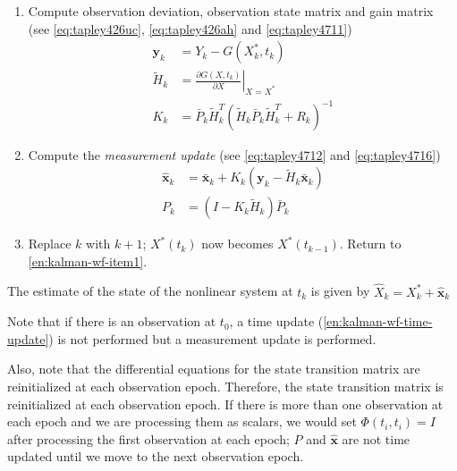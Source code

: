 \begin{enumerate}
	\item Compute observation deviation, observation state matrix and gain matrix (see \ref{eq:tapley426uc}, \ref{eq:tapley426ah} and \ref{eq:tapley4711})
	      \begin{subequations}
		      \begin{align}
			      \bm{y}_k    & = Y_k - G(X^*_k , t_k )                                         \\
			      \tilde{H}_k & = \left.\frac{\partial G(X , t_k )}{\partial X} \right|_{X=X^*} \\
			      K_k         & =
			      \bar{P}_k \tilde{H}^T_k
			      \left( \tilde{H}_k \bar{P}_k \tilde{H}^T_k + R_k \right) ^{-1}
		      \end{align}
	      \end{subequations}

	\item Compute the \emph{measurement update} (see \ref{eq:tapley4712} and \ref{eq:tapley4716})
	      \begin{subequations}
		      \begin{align}
			      \hat{\bm{x}}_k & = \bar{\bm{x}}_k + K_k \left( \bm{y}_k - \tilde{H}_k \bar{\bm{x}}_k \right) \\
			      P_k            & = \left( I - K_k \tilde{H}_k \right) \bar{P}_k
		      \end{align}
	      \end{subequations}

	\item Replace \(k\) with \(k+1\); \(X^*(t_k)\) now becomes \(X^*(t_{k-1})\).
	      Return to \ref{en:kalman-wf-item1}.

\end{enumerate}

The estimate of the state of the nonlinear system at \(t_k\) is given by
\(\hat{X}_k = X^*_k + \hat{\bm{x}}_k\)

Note that if there is an observation at \(t_0\), a time update (\ref{en:kalman-wf-time-update}) is not performed but a measurement update is performed.

Also, note that the differential equations for the state transition matrix
are reinitialized at each observation epoch. Therefore, the state transition matrix
is reinitialized at each observation epoch. If there is more than one observation
at each epoch and we are processing them as scalars, we would set \(\Phi (t_i , t_i ) = I\)
after processing the first observation at each epoch; \(P\) and \(\hat{\bm{x}}\) are not
time updated until we move to the next observation epoch.

